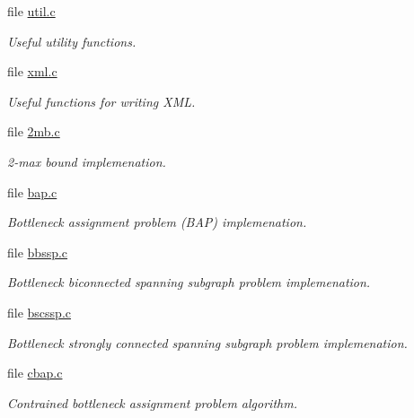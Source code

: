 \begin{CompactItemize}
\item 
file \hyperlink{util_8c}{util.c}
\begin{CompactList}\small\item\em Useful utility functions. \item\end{CompactList}

\item 
file \hyperlink{xml_8c}{xml.c}
\begin{CompactList}\small\item\em Useful functions for writing XML. \item\end{CompactList}

\item 
file \hyperlink{lib_2lb_22mb_8c}{2mb.c}
\begin{CompactList}\small\item\em 2-max bound implemenation. \item\end{CompactList}

\item 
file \hyperlink{lib_2lb_2bap_8c}{bap.c}
\begin{CompactList}\small\item\em Bottleneck assignment problem (BAP) implemenation. \item\end{CompactList}

\item 
file \hyperlink{lib_2lb_2bbssp_8c}{bbssp.c}
\begin{CompactList}\small\item\em Bottleneck biconnected spanning subgraph problem implemenation. \item\end{CompactList}

\item 
file \hyperlink{lib_2lb_2bscssp_8c}{bscssp.c}
\begin{CompactList}\small\item\em Bottleneck strongly connected spanning subgraph problem implemenation. \item\end{CompactList}

\item 
file \hyperlink{lib_2lb_2cbap_8c}{cbap.c}
\begin{CompactList}\small\item\em Contrained bottleneck assignment problem algorithm. \item\end{CompactList}


\end{CompactItemize}
